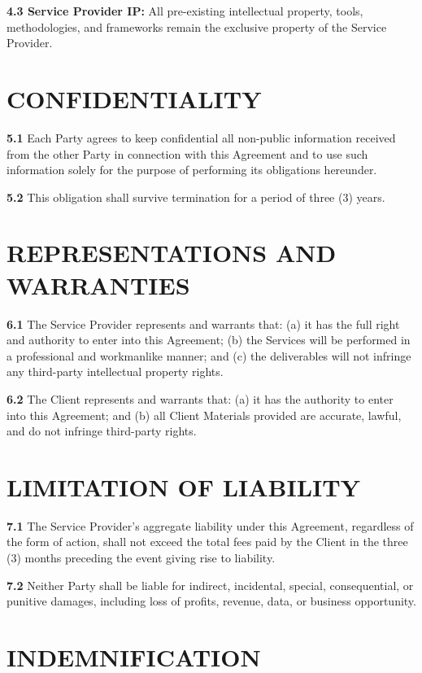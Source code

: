 \documentclass[10pt]{article}
\begin{document}
\textbf{4.3 Service Provider IP:} All pre-existing intellectual property, tools, methodologies, and frameworks remain the exclusive property of the Service Provider.

\section{CONFIDENTIALITY}

\textbf{5.1} Each Party agrees to keep confidential all non-public information received from the other Party in connection with this Agreement and to use such information solely for the purpose of performing its obligations hereunder.

\textbf{5.2} This obligation shall survive termination for a period of three (3) years.

\section{REPRESENTATIONS AND WARRANTIES}

\textbf{6.1} The Service Provider represents and warrants that: (a) it has the full right and authority to enter into this Agreement; (b) the Services will be performed in a professional and workmanlike manner; and (c) the deliverables will not infringe any third-party intellectual property rights.

\textbf{6.2} The Client represents and warrants that: (a) it has the authority to enter into this Agreement; and (b) all Client Materials provided are accurate, lawful, and do not infringe third-party rights.

\section{LIMITATION OF LIABILITY}

\textbf{7.1} The Service Provider's aggregate liability under this Agreement, regardless of the form of action, shall not exceed the total fees paid by the Client in the three (3) months preceding the event giving rise to liability.

\textbf{7.2} Neither Party shall be liable for indirect, incidental, special, consequential, or punitive damages, including loss of profits, revenue, data, or business opportunity.

\section{INDEMNIFICATION}
\end{document}
